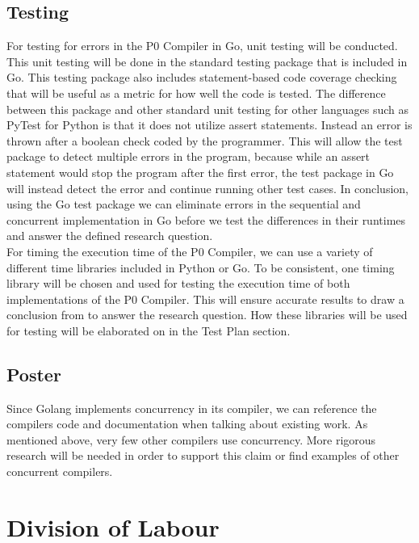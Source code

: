 \documentclass{article}
\begin{document}
\subsection{Testing} %

For testing for errors in the P0 Compiler in Go, unit testing will be conducted. This unit testing will be done in the standard testing package that is
included in Go. This testing package also includes statement-based code coverage checking that will be useful as a metric for how well the code is tested.
The difference between this package and other standard unit testing for other languages such as PyTest for Python is that it does not utilize assert statements.
Instead an error is thrown after a boolean check coded by the programmer. This will allow the test package to detect multiple errors in the program, because
while an assert statement would stop the program after the first error, the test package in Go will instead detect the error and continue running other test cases.
In conclusion, using the Go test package we can eliminate errors in the sequential and concurrent implementation in Go before we test the differences in their runtimes
and answer the defined research question. \\    

For timing the execution time of the P0 Compiler, we can use a variety of different time libraries included in Python or Go. To be consistent, one timing library 
will be chosen
and used for testing the execution time of both implementations of the P0 Compiler. This will ensure 
accurate results to draw a conclusion from to answer the research question. How these libraries will be used for testing will be elaborated on in the Test Plan section.

\subsection{Poster} %

Since Golang implements concurrency in its compiler, we can reference the
compilers code and documentation when talking about existing work.
As mentioned above, very few other compilers use concurrency.
More rigorous research will be needed in order to support this claim or
find examples of other concurrent compilers.

\section{Division of Labour} %
\end{document}

